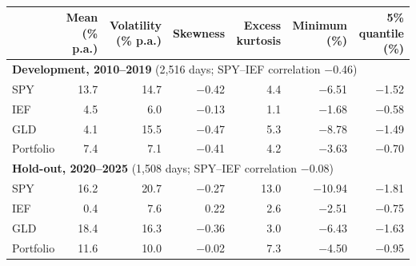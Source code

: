 \begin{table}[t]
\centering{}\footnotesize\setlength{\tabcolsep}{4pt}
\caption{}\label{tab:data-summary}
\begin{tabular}{lrrrrrr}
\toprule
 & Mean (\% p.a.) & Volatility (\% p.a.) & Skewness & Excess kurtosis & Minimum (\%) & 5\% quantile (\%) \\
\midrule
\multicolumn{7}{l}{\textbf{Development, 2010--2019} (2,516 days; SPY--IEF correlation $-$0.46)}\\
SPY & 13.7 & 14.7 & $-$0.42 & 4.4 & $-$6.51 & $-$1.52 \\
IEF & 4.5 & 6.0 & $-$0.13 & 1.1 & $-$1.68 & $-$0.58 \\
GLD & 4.1 & 15.5 & $-$0.47 & 5.3 & $-$8.78 & $-$1.49 \\
Portfolio & 7.4 & 7.1 & $-$0.41 & 4.2 & $-$3.63 & $-$0.70 \\
\midrule
\multicolumn{7}{l}{\textbf{Hold-out, 2020--2025} (1,508 days; SPY--IEF correlation $-$0.08)}\\
SPY & 16.2 & 20.7 & $-$0.27 & 13.0 & $-$10.94 & $-$1.81 \\
IEF & 0.4 & 7.6 & 0.22 & 2.6 & $-$2.51 & $-$0.75 \\
GLD & 18.4 & 16.3 & $-$0.36 & 3.0 & $-$6.43 & $-$1.63 \\
Portfolio & 11.6 & 10.0 & $-$0.02 & 7.3 & $-$4.50 & $-$0.95 \\
\bottomrule
\end{tabular}
\end{table}
